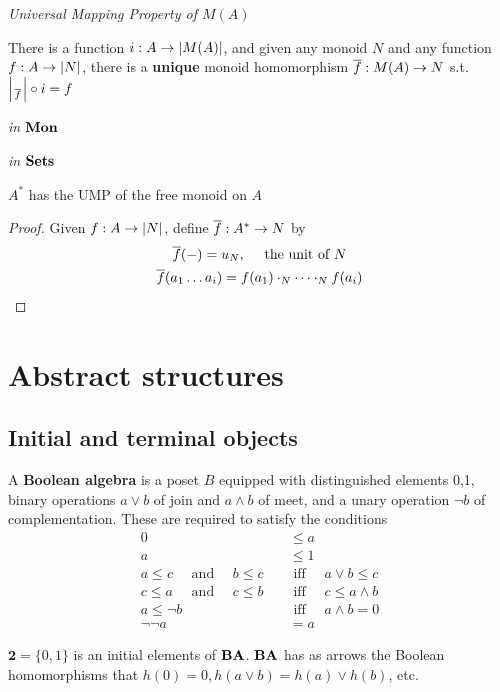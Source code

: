 \documentclass[11pt]{article}
\begin{document}
\emph{Universal Mapping Property of \(M(A)\)}

There is a function \(i:A\to\abs{M(A)}\), and given any monoid \(N\) and any
function \(f:A\to\abs{N}\), there is a \textbf{unique} monoid homomorphism
\(\overline{f}:M(A)\to N\) s.t. \(\abs{\over{f}}\circ i=f\)

\emph{in} \(\operatorname{\textbf{Mon}}\)
\begin{center}\end{center}

\emph{in} \(\operatorname{\textbf{Sets}}\)
\begin{center}\end{center}
\begin{proposition}[]
\(A^*\) has the UMP of the free monoid on \(A\)
\end{proposition}

\begin{proof}
Given \(f:A\to\abs{N}\), define \(\overline{f}:A^*\to N\) by
\begin{gather*}
\overline{f}(-)=u_N,\quad\text{ the unit of } N\\
\overline{f}(a_1\dots a_i)=f(a_1)\cdot_N\dots\cdot_N f(a_i)
\end{gather*}
\end{proof}


\section{Abstract structures}
\label{sec:orgbdcaf14}

\subsection{Initial and terminal objects}
\label{sec:orga9a9617}
\begin{examplle}[]
A \textbf{Boolean algebra} is a poset \(B\) equipped with distinguished elements 0,1,
binary operations \(a\vee b\) of join and \(a\wedge b\) of meet, and a unary
operation \(\neg b\) of complementation. These are required to satisfy the
conditions
\begin{align*}
0&\le a\\
a&\le 1\\
a\le c \quad\text{ and }\quad b\le c \quad&\text{ iff }\quad a\vee b\le c\\
c\le a \quad\text{ and }\quad c\le b \quad&\text{ iff }\quad c\le a\wedge b\\
a\le\neg b \quad&\text{ iff }\quad a\wedge b=0\\
\neg\neg a&=a
\end{align*}

\(\textbf{2}=\{0,1\}\) is an initial elements of \(\operatorname{\textbf{BA}}\). \(\operatorname{\textbf{BA}}\) has as
arrows the Boolean homomorphisms that \(h(0)=0,h(a\vee b)=h(a)\vee h(b)\), etc.
\end{examplle}
\end{document}
